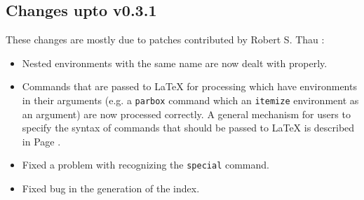 \subsection{Changes upto v0.3.1}
These changes are mostly due to patches contributed by Robert S. Thau
:
\begin{itemize}
\item Nested environments with the same name are now dealt with
properly.
\item Commands that are passed to LaTeX for processing which have 
environments in their arguments (e.g. a \texttt{parbox} command which 
an \texttt{itemize} environment as an argument) are now
processed correctly. A general mechanism for users to 
specify the syntax of commands that should be passed to LaTeX 
is described in Page \pageref{pass}.
\item Fixed a problem with recognizing the \texttt{special} command.
\item Fixed bug in the generation of the index.
\end{itemize}

